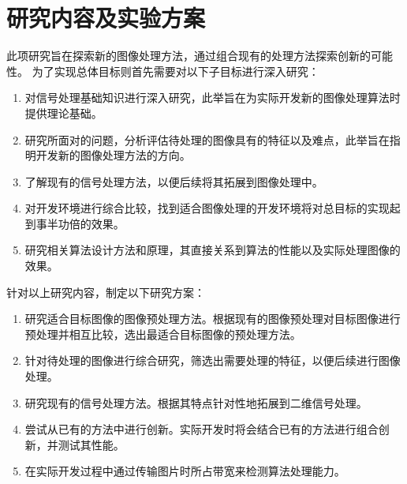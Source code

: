 %
%
%
%

\section{研究内容及实验方案}

此项研究旨在探索新的图像处理方法，通过组合现有的处理方法探索创新的可能性。
为了实现总体目标则首先需要对以下子目标进行深入研究：
\begin{enumerate}[label=\arabic*)]
    \item 对信号处理基础知识进行深入研究，此举旨在为实际开发新的图像处理算法时提供理论基础。
    \item 研究所面对的问题，分析评估待处理的图像具有的特征以及难点，此举旨在指明开发新的图像处理方法的方向。
    \item 了解现有的信号处理方法，以便后续将其拓展到图像处理中。
    \item 对开发环境进行综合比较，找到适合图像处理的开发环境将对总目标的实现起到事半功倍的效果。
    \item 研究相关算法设计方法和原理，其直接关系到算法的性能以及实际处理图像的效果。
\end{enumerate}



针对以上研究内容，制定以下研究方案：
\begin{enumerate}[label=\arabic*)]
    \item 研究适合目标图像的图像预处理方法。根据现有的图像预处理对目标图像进行预处理并相互比较，选出最适合目标图像的预处理方法。
    \item 针对待处理的图像进行综合研究，筛选出需要处理的特征，以便后续进行图像处理。
    \item 研究现有的信号处理方法。根据其特点针对性地拓展到二维信号处理。
    \item 尝试从已有的方法中进行创新。实际开发时将会结合已有的方法进行组合创新，并测试其性能。
    \item 在实际开发过程中通过传输图片时所占带宽来检测算法处理能力。
\end{enumerate}

